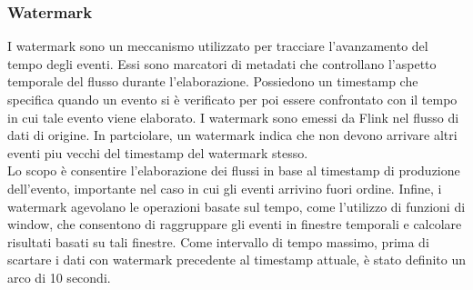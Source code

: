 \documentclass[8pt]{article}
\begin{document}
\subsubsection{Watermark}
I watermark sono un meccanismo utilizzato per tracciare l’avanzamento del
tempo degli eventi. Essi sono marcatori di metadati che controllano l’aspetto temporale del flusso durante l’elaborazione. Possiedono un timestamp che specifica quando un evento si è verificato per poi essere confrontato con il tempo in cui tale evento viene elaborato. I watermark sono emessi da Flink nel flusso di dati di origine. In partciolare, un watermark indica che non devono arrivare altri eventi piu vecchi del timestamp del watermark stesso.
\\Lo scopo è consentire l'elaborazione dei flussi in base al timestamp di produzione dell’evento, importante nel caso in cui gli eventi arrivino fuori ordine.
Infine, i watermark agevolano le operazioni basate sul tempo, come l’utilizzo di funzioni di window, che consentono di raggruppare gli eventi in finestre temporali e calcolare risultati basati su tali finestre.
Come intervallo di tempo massimo, prima di scartare i dati con watermark precedente al timestamp attuale, è stato definito un arco di 10 secondi.
\end{document}
